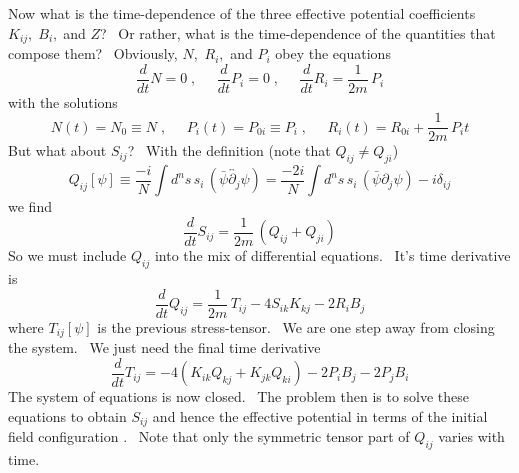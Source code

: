 \documentclass[a4paper,12pt]{article}%
\begin{document}
Now what is the time-dependence of the three effective potential coefficients
$K_{ij},\;B_{i},\;$and $Z$? \ Or rather, what is the time-dependence of the
quantities that compose them? \ Obviously, $N,$ $R_{i},$ and $P_{i}$ obey the
equations
\[
\frac{d}{dt}N=0\;,\;\;\;\;\;\frac{d}{dt}P_{i}=0\;,\;\;\;\;\;\frac{d}{dt}%
R_{i}=\frac{1}{2m}\,P_{i}%
\]
with the solutions
\[
N\left(  t\right)  =N_{0}\equiv N\;,\;\;\;\;\;P_{i}\left(  t\right)
=P_{0i}\equiv P_{i}\;,\;\;\;\;\;R_{i}\left(  t\right)  =R_{0i}+\frac{1}%
{2m}\,P_{i}t
\]
But what about $S_{ij}$? \ With the definition (note that $Q_{ij}\neq Q_{ji}%
$)
\[
Q_{ij}\left[  \psi\right]  \equiv\frac{-i}{N}\int d^{n}s\,s_{i}\,\left(
\bar{\psi}\overleftrightarrow{\partial_{j}}\psi\right)  =\frac{-2i}{N}\int
d^{n}s\,s_{i}\,\left(  \bar{\psi}\partial_{j}\psi\right)  -i\delta_{ij}%
\]
we find
\[
\frac{d}{dt}S_{ij}=\frac{1}{2m}\,\left(  Q_{ij}+Q_{ji}\right)
\]
So we must include $Q_{ij}$ into the mix of differential equations. \ It's
time derivative is
\[
\frac{d}{dt}Q_{ij}=\frac{1}{2m}\,T_{ij}-4S_{ik}K_{kj}-2R_{i}B_{j}%
\]
where $T_{ij}\left[  \psi\right]  $ is the previous stress-tensor. \ We are
one step away from closing the system. \ We just need the final time
derivative
\[
\frac{d}{dt}T_{ij}=-4\left(  K_{ik}Q_{kj}+K_{jk}Q_{ki}\right)  -2P_{i}%
B_{j}-2P_{j}B_{i}%
\]
The system of equations is now closed. \ The problem then is to solve these
equations to obtain $S_{ij}$ and hence the effective potential in terms of the
initial field configuration . \ Note that only the symmetric tensor part of
$Q_{ij}$ varies with time. \ 
\end{document}

